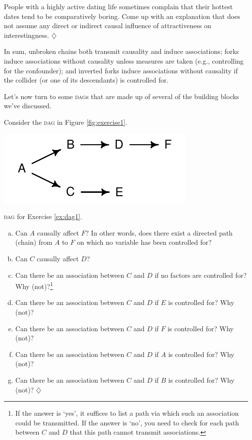 \documentclass[a4paper]{tufte-book}\usepackage[]{graphicx}\usepackage[]{xcolor}
\newcommand*{\parend}[1][$\diamondsuit$]{%
\leavevmode\unskip\penalty9999 \hbox{}\nobreak\hfill
    \quad\hbox{#1}%
}
\begin{document}
  People with a highly active dating life sometimes complain that their
  hottest dates tend to be comparatively boring.
  Come up with an explanation that does not assume any direct or indirect
  causal influence of attractiveness on interestingness.
\parend

\begin{framed}
In sum, unbroken chains both transmit causality and induce associations;
forks induce associations without causality unless measures are taken (e.g., controlling for the confounder);
and inverted forks induce associations without causality if the collider (or one of its descendants) is controlled for.
\end{framed}

Let's now turn to some \textsc{dag}s that are made up of several of the building
blocks we've discussed.

Consider the \textsc{dag} in Figure \ref{fig:exercise1}.\label{ex:dag1}

\begin{marginfigure}[3cm]
  \includegraphics[width=\textwidth]{figure/exercise1}
  \caption{\textsc{dag} for Exercise \ref{ex:dag1}.}
  \label{fig:exercise1}
\end{marginfigure}

  \begin{enumerate}[(a)]
    \item Can $A$ causally affect $F$? In other words, does there exist a directed path (chain)
    from $A$ to $F$ on which no variable has been controlled for?
    \item Can $C$ causally affect $D$?
    \item Can there be an association between $C$ and $D$
    if no factors are controlled for? Why (not)?\footnote{If the answer is `yes', it suffices
    to list a path via which such an association could be transmitted.
    If the answer is `no', you need to check for each path between $C$ and $D$ that 
    this path cannot transmit associations.}
    \item Can there be an association between $C$ and $D$ if
    $E$ is controlled for? Why (not)?
    \item Can there be an association between $C$ and $D$ if
    $F$ is controlled for? Why (not)?
    \item Can there be an association between $C$ and $D$ if
    $A$ is controlled for? Why (not)?
    \item Can there be an association between $C$ and $D$ if
    $B$ is controlled for? Why (not)? \parend
  \end{enumerate}
\end{document}
